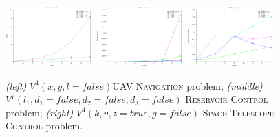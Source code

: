 \begin{figure}[tbp!]
\centering
\includegraphics[width=0.30\textwidth]{Figures/inventory/invent2Nodes.pdf}
\includegraphics[width=0.30\textwidth]{Figures/inventory/invent2Time.pdf}
\includegraphics[width=0.30\textwidth]{Figures/inventory/invent2MaxErr.pdf}
\vspace{-2mm}
\caption{\footnotesize
{\it (left)}  $V^4(x,y,l=false)$\textsc{UAV Navigation} problem;
{\it (middle)} $V^7(l_1,d_1=false,d_2=false,d_3=false)$ \textsc{Reservoir Control} problem;
{\it (right)} $V^4(k,v,z=true,g=false)$ \textsc{Space Telescope Control} problem.
}
\label{fig:Value}
\vspace{-5mm}
\end{figure}


